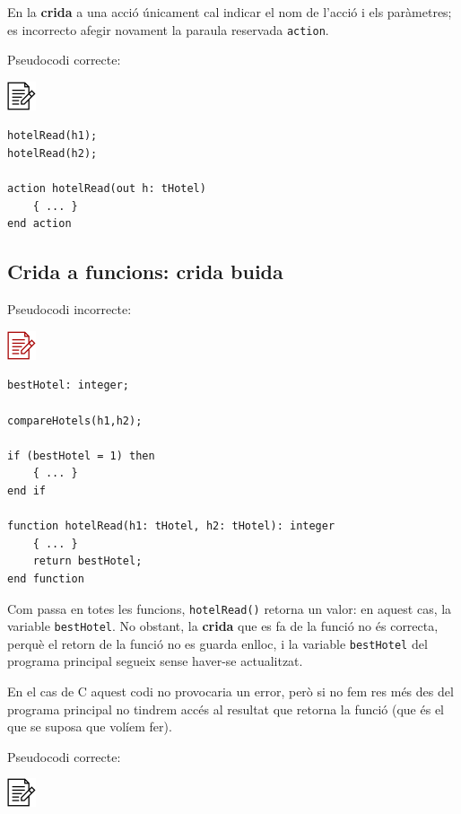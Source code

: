 \documentclass[
]{book}
\begin{document}
En la \textbf{crida} a una acció únicament cal indicar el nom de l'acció i els paràmetres; es incorrecto afegir novament la paraula reservada \texttt{action}.

Pseudocodi correcte:

\includegraphics{./img/alg.png}

\begin{verbatim}
hotelRead(h1);
hotelRead(h2);

action hotelRead(out h: tHotel)
    { ... }
end action
\end{verbatim}

\hypertarget{crida-a-funcions-crida-buida}{%
\subsection{Crida a funcions: crida buida}\label{crida-a-funcions-crida-buida}}

Pseudocodi incorrecte:

\includegraphics{./img/alg_err.png}

\begin{verbatim}
bestHotel: integer;

compareHotels(h1,h2);

if (bestHotel = 1) then
    { ... }
end if  

function hotelRead(h1: tHotel, h2: tHotel): integer
    { ... }
    return bestHotel;
end function
\end{verbatim}

Com passa en totes les funcions, \texttt{hotelRead()} retorna un valor: en aquest cas, la variable \texttt{bestHotel}. No obstant, la \textbf{crida} que es fa de la funció no és correcta, perquè el retorn de la funció no es guarda enlloc, i la variable \texttt{bestHotel} del programa principal segueix sense haver-se actualitzat.

En el cas de C aquest codi no provocaria un error, però si no fem res més des del programa principal no tindrem accés al resultat que retorna la funció (que és el que se suposa que volíem fer).

Pseudocodi correcte:

\includegraphics{./img/alg.png}
\end{document}
